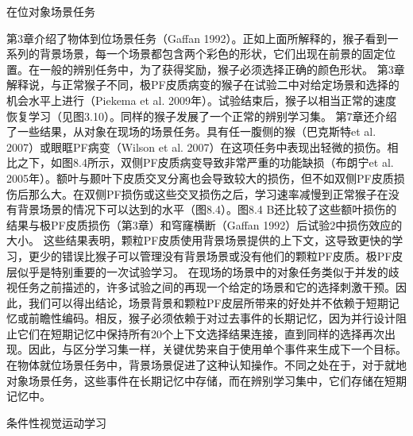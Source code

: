 在位对象场景任务

第3章介绍了物体到位场景任务（Gaffan 1992）。正如上面所解释的，猴子看到一系列的背景场景，每一个场景都包含两个彩色的形状，它们出现在前景的固定位置。在一般的辨别任务中，为了获得奖励，猴子必须选择正确的颜色形状。
第3章解释说，与正常猴子不同，极PF皮质病变的猴子在试验二中对给定场景和选择的机会水平上进行（Piekema et al. 2009年）。试验结束后，猴子以相当正常的速度恢复学习（见图3.10）。同样的猴子发展了一个正常的辨别学习集。
第7章还介绍了一些结果，从对象在现场的场景任务。具有任一腹侧的猴（巴克斯特et al. 2007）或眼眶PF病变（Wilson et al. 2007）在这项任务中表现出轻微的损伤。相比之下，如图8.4所示，双侧PF皮质病变导致非常严重的功能缺损（布朗宁et al. 2005年）。额叶与颞叶下皮质交叉分离也会导致较大的损伤，但不如双侧PF皮质损伤后那么大。在双侧PF损伤或这些交叉损伤之后，学习速率减慢到正常猴子在没有背景场景的情况下可以达到的水平（图8.4）。图8.4 B还比较了这些额叶损伤的结果与极PF皮质损伤（第3章）和穹窿横断（Gaffan 1992）后试验2中损伤效应的大小。
这些结果表明，颗粒PF皮质使用背景场景提供的上下文，这导致更快的学习，更少的错误比猴子可以管理没有背景场景或没有他们的颗粒PF皮质。极PF皮层似乎是特别重要的一次试验学习。
在现场的场景中的对象任务类似于并发的歧视任务之前描述的，许多试验之间的再现一个给定的场景和它的选择刺激干预。因此，我们可以得出结论，场景背景和颗粒PF皮层所带来的好处并不依赖于短期记忆或前瞻性编码。相反，猴子必须依赖于对过去事件的长期记忆，因为并行设计阻止它们在短期记忆中保持所有20个上下文选择结果连接，直到同样的选择再次出现。因此，与区分学习集一样，关键优势来自于使用单个事件来生成下一个目标。在物体就位场景任务中，背景场景促进了这种认知操作。不同之处在于，对于就地对象场景任务，这些事件在长期记忆中存储，而在辨别学习集中，它们存储在短期记忆中。

条件性视觉运动学习

